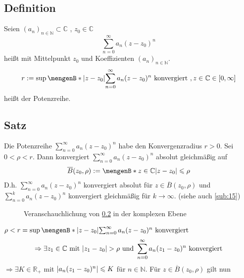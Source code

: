 \subsection[Definition Potenzreihe und Konvergenzradius]{Definition} %
\label{sub:19}
Seien $(a_n)_{n \in \mathds{N} } \subset \mathds{C}$ , $z_0 \in \mathds{C}$
\[
	\sum_{n=0}^{\infty} a_n (z-z_0)^n 
\]
heißt  mit Mittelpunkt $z_0$ und Koeffizienten $(a_n)_{n \in \mathds{N}}$.
\[
	r := \sup \set[\abs*{z -z_0} ]{ \sum_{n=0}^{\infty} a_n (z-z_0)^n \text{ konvergiert } , z \in \mathds{C} } \in [0, \infty]
\]
heißt  der Potenzreihe.

\subsection[Satz über absolute gleichmäßige Konvergenz innerhalb des Konvergenzradius]{Satz} %
\label{sub:110}
Die Potenzreihe $\sum_{n=0}^{\infty} a_n (z-z_0)^n$ habe den Konvergenzradius $r>0$. Sei $0 < \rho < r$. Dann konvergiert $\sum_{n=0}^{\infty} a_n (z -z_0)^n$ absolut
gleichmäßig auf 
\[
	\overline{B}(z_0, \rho) := \set[z \in \mathds{C}]{\abs*{z-z_0} \le \rho }  
\]
D.h. $\sum_{n=0}^{\infty} a_n (z-z_0)^n $ konvergiert absolut für $z \in \overline{B}(z_0, \rho) $ und $\sum_{n=0}^{k} a_n (z-z_0 )^n$ konvergiert gleichmäßig für
$k \to \infty$. {\footnotesize (siehe auch \ref{sub:15})}
\begin{figure}[ht]
	\caption{Veranschauchlichung von \ref{sub:110} in der komplexen Ebene}
\end{figure}
$\rho < r = \sup \set[\abs*{z -z_0} ]{ \sum_{n=0}^{\infty} a_n (z-z_0)^n \text{ konvergiert}}$ 
\[
	\Rightarrow \exists z_1 \in \mathds{C} \text{ mit } \abs*{z_1 -z_0} > \rho \text{ und } \sum_{n=0}^{\infty} a_n (z_1 -z_0)^n \text{ konvergiert} 
\]
$\Rightarrow \exists K \in \mathds{R}_+$ mit $\abs*{a_n (z_1 -z _0)^n}\le  K$ für $n \in \mathds{N} $. Für $z \in \overline{B}(z_0, \rho) $ gilt nun 
